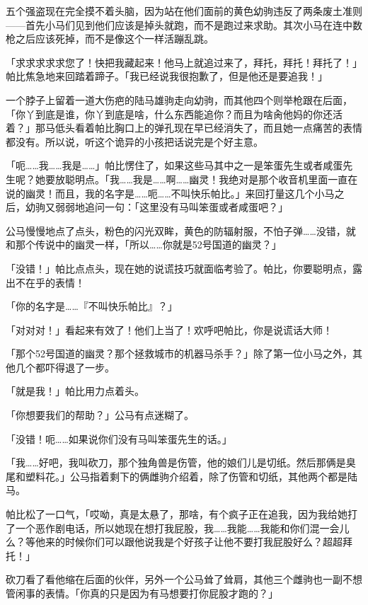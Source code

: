 \horizonline


五个强盗现在完全摸不着头脑，因为站在他们面前的黄色幼驹违反了两条废土准则——首先小马们见到他们应该是掉头就跑，而不是跑过来求助。其次小马在连中数枪之后应该死掉，而不是像这个一样活蹦乱跳。

「求求求求求您了！快把我藏起来！他马上就追过来了，拜托，拜托！拜托了！」帕比焦急地来回踏着蹄子。「我已经说我很抱歉了，但是他还是要追我！」

一个脖子上留着一道大伤疤的陆马雄驹走向幼驹，而其他四个则举枪跟在后面，「你丫到底是谁，你丫到底是啥，什么东西能追你？而且为啥肏他妈的你还活着？」那马低头看着帕比胸口上的弹孔现在早已经消失了，而且她一点痛苦的表情都没有。所以说，听这个诡异的小孩把话说完是个好主意。

「呃……我……我是……」帕比愣住了，如果这些马其中之一是笨蛋先生或者咸蛋先生呢？她要放聪明点。「我……我是……啊……幽灵！我绝对是那个收音机里面一直在说的幽灵！而且，我的名字是……呃……不叫快乐帕比。」来回打量这几个小马之后，幼驹又弱弱地追问一句：「这里没有马叫笨蛋或者咸蛋吧？」

公马慢慢地点了点头，粉色的闪光双眸，黄色的防辐射服，不怕子弹……没错，就和那个传说中的幽灵一样，「所以……你就是52号国道的幽灵？」

「没错！」帕比点点头，现在她的说谎技巧就面临考验了。帕比，你要聪明点，露出不在乎的表情！

「你的名字是……『不叫快乐帕比』？」

「对对对！」看起来有效了！他们上当了！欢呼吧帕比，你是说谎话大师！

「那个52号国道的幽灵？那个拯救城市的机器马杀手？」除了第一位小马之外，其他几个都吓得退了一步。

「就是我！」帕比用力点着头。

「你想要我们的帮助？」公马有点迷糊了。

「没错！呃……如果说你们没有马叫笨蛋先生的话。」

「我……好吧，我叫砍刀，那个独角兽是伤管，他的娘们儿是切纸。然后那俩是臭尾和塑料花。」公马指着剩下的俩雌驹介绍着，除了伤管和切纸，其他两个都是陆马。

帕比松了一口气，「哎呦，真是太悬了，那啥，有个疯子正在追我，因为我给她打了一个恶作剧电话，所以她现在想打我屁股，我……我能……我能和你们混一会儿么？等他来的时候你们可以跟他说我是个好孩子让他不要打我屁股好么？超超拜托！」

砍刀看了看他缩在后面的伙伴，另外一个公马耸了耸肩，其他三个雌驹也一副不想管闲事的表情。「你真的只是因为有马想要打你屁股才跑的？」

